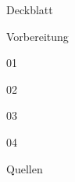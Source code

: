 \documentclass[11pt]{scrreprt}
\begin{document}
\setcounter{page}{1}   %

{Deckblatt}

\setcounter{chapter}{-1} 
\tableofcontents %
\pagebreak

% 




{Vorbereitung}

{01}

{02}

{03}

{04}


{Quellen}

\newpage
{}
 
\end{document}

